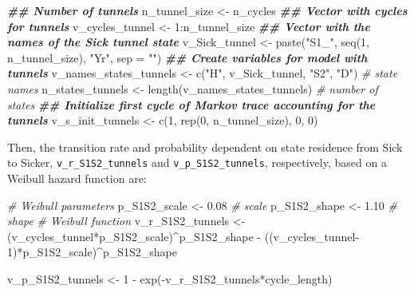 \documentclass[
]{article}
\newenvironment{Shaded}{\begin{snugshade}}{\end{snugshade}}
\newcommand{\AttributeTok}[1]{\textcolor[rgb]{0.77,0.63,0.00}{#1}}
\newcommand{\CommentTok}[1]{\textcolor[rgb]{0.56,0.35,0.01}{\textit{#1}}}
\newcommand{\DecValTok}[1]{\textcolor[rgb]{0.00,0.00,0.81}{#1}}
\newcommand{\DocumentationTok}[1]{\textcolor[rgb]{0.56,0.35,0.01}{\textbf{\textit{#1}}}}
\newcommand{\FloatTok}[1]{\textcolor[rgb]{0.00,0.00,0.81}{#1}}
\newcommand{\FunctionTok}[1]{\textcolor[rgb]{0.00,0.00,0.00}{#1}}
\newcommand{\NormalTok}[1]{#1}
\newcommand{\OtherTok}[1]{\textcolor[rgb]{0.56,0.35,0.01}{#1}}
\newcommand{\SpecialCharTok}[1]{\textcolor[rgb]{0.00,0.00,0.00}{#1}}
\newcommand{\StringTok}[1]{\textcolor[rgb]{0.31,0.60,0.02}{#1}}
\begin{document}
\begin{Shaded}
\begin{Highlighting}[]
\DocumentationTok{\#\# Number of tunnels}
\NormalTok{n\_tunnel\_size }\OtherTok{\textless{}{-}}\NormalTok{ n\_cycles }
\DocumentationTok{\#\# Vector with cycles for tunnels}
\NormalTok{v\_cycles\_tunnel }\OtherTok{\textless{}{-}} \DecValTok{1}\SpecialCharTok{:}\NormalTok{n\_tunnel\_size}
\DocumentationTok{\#\# Vector with the names of the Sick tunnel state}
\NormalTok{v\_Sick\_tunnel }\OtherTok{\textless{}{-}} \FunctionTok{paste}\NormalTok{(}\StringTok{"S1\_"}\NormalTok{, }\FunctionTok{seq}\NormalTok{(}\DecValTok{1}\NormalTok{, n\_tunnel\_size), }\StringTok{"Yr"}\NormalTok{, }\AttributeTok{sep =} \StringTok{""}\NormalTok{)}
\DocumentationTok{\#\# Create variables for model with tunnels}
\NormalTok{v\_names\_states\_tunnels }\OtherTok{\textless{}{-}} \FunctionTok{c}\NormalTok{(}\StringTok{"H"}\NormalTok{, v\_Sick\_tunnel, }\StringTok{"S2"}\NormalTok{, }\StringTok{"D"}\NormalTok{) }\CommentTok{\# state names}
\NormalTok{n\_states\_tunnels }\OtherTok{\textless{}{-}} \FunctionTok{length}\NormalTok{(v\_names\_states\_tunnels)         }\CommentTok{\# number of states}
\DocumentationTok{\#\# Initialize first cycle of Markov trace accounting for the tunnels}
\NormalTok{v\_s\_init\_tunnels }\OtherTok{\textless{}{-}} \FunctionTok{c}\NormalTok{(}\DecValTok{1}\NormalTok{, }\FunctionTok{rep}\NormalTok{(}\DecValTok{0}\NormalTok{, n\_tunnel\_size), }\DecValTok{0}\NormalTok{, }\DecValTok{0}\NormalTok{) }
\end{Highlighting}
\end{Shaded}

Then, the transition rate and probability dependent on state residence from Sick to Sicker, \texttt{v\_r\_S1S2\_tunnels} and \texttt{v\_p\_S1S2\_tunnels}, respectively, based on a Weibull hazard function are:

\begin{Shaded}
\begin{Highlighting}[]
\CommentTok{\# Weibull parameters}
\NormalTok{p\_S1S2\_scale }\OtherTok{\textless{}{-}} \FloatTok{0.08} \CommentTok{\# scale}
\NormalTok{p\_S1S2\_shape }\OtherTok{\textless{}{-}} \FloatTok{1.10} \CommentTok{\# shape}
\CommentTok{\# Weibull function}
\NormalTok{v\_r\_S1S2\_tunnels }\OtherTok{\textless{}{-}}\NormalTok{ (v\_cycles\_tunnel}\SpecialCharTok{*}\NormalTok{p\_S1S2\_scale)}\SpecialCharTok{\^{}}\NormalTok{p\_S1S2\_shape }\SpecialCharTok{{-}}
\NormalTok{                    ((v\_cycles\_tunnel}\DecValTok{{-}1}\NormalTok{)}\SpecialCharTok{*}\NormalTok{p\_S1S2\_scale)}\SpecialCharTok{\^{}}\NormalTok{p\_S1S2\_shape}
                    
\NormalTok{v\_p\_S1S2\_tunnels }\OtherTok{\textless{}{-}} \DecValTok{1} \SpecialCharTok{{-}} \FunctionTok{exp}\NormalTok{(}\SpecialCharTok{{-}}\NormalTok{v\_r\_S1S2\_tunnels}\SpecialCharTok{*}\NormalTok{cycle\_length)}
\end{Highlighting}
\end{Shaded}
\end{document}
